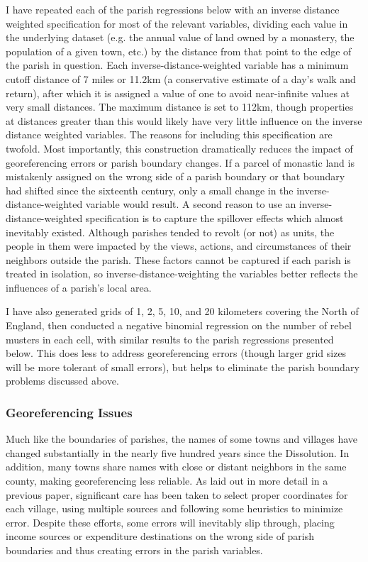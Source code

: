\documentclass[12pt]{article}
\begin{document}
I have repeated each of the parish regressions below with an inverse distance weighted specification for most of the relevant variables, dividing each value in the underlying dataset (e.g. the annual value of land owned by a monastery, the population of a given town, etc.) by the distance from that point to the edge of the parish in question. Each inverse-distance-weighted variable has a minimum cutoff distance of 7 miles or 11.2km (a conservative estimate of a day's walk and return), after which it is assigned a value of one to avoid near-infinite values at very small distances.\autocite[147]{Horrox2006} The maximum distance is set to 112km, though properties at distances greater than this would likely have very little influence on the inverse distance weighted variables. The reasons for including this specification are twofold. Most importantly, this construction dramatically reduces the impact of georeferencing errors or parish boundary changes. If a parcel of monastic land is mistakenly assigned on the wrong side of a parish boundary or that boundary had shifted since the sixteenth century, only a small change in the inverse-distance-weighted variable would result. A second reason to use an inverse-distance-weighted specification is to capture the spillover effects which almost inevitably existed. Although parishes tended to revolt (or not) as units, the people in them were impacted by the views, actions, and circumstances of their neighbors outside the parish. These factors cannot be captured if each parish is treated in isolation, so inverse-distance-weighting the variables better reflects the influences of a parish's local area.

I have also generated grids of 1, 2, 5, 10, and 20 kilometers covering the North of England, then conducted a negative binomial regression on the number of rebel musters in each cell, with similar results to the parish regressions presented below. This does less to address georeferencing errors (though larger grid sizes will be more tolerant of small errors), but helps to eliminate the parish boundary problems discussed above.

\subsubsection{Georeferencing Issues}

Much like the boundaries of parishes, the names of some towns and villages have changed substantially in the nearly five hundred years since the Dissolution. In addition, many towns share names with close or distant neighbors in the same county, making georeferencing less reliable. As laid out in more detail in a previous paper, significant care has been taken to select proper coordinates for each village, using multiple sources and following some heuristics to minimize error. Despite these efforts, some errors will inevitably slip through, placing income sources or expenditure destinations on the wrong side of parish boundaries and thus creating errors in the parish variables. 
\end{document}
